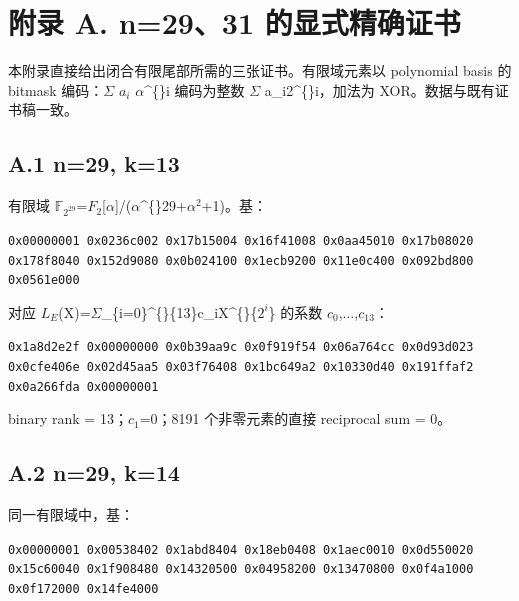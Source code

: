 \documentclass[11pt]{ctexart}
\begin{document}
\section{附录 A. n=29、31 的显式精确证书}

本附录直接给出闭合有限尾部所需的三张证书。有限域元素以 polynomial basis 的 bitmask 编码：\ensuremath{\Sigma} \ensuremath{a_{i}} \ensuremath{\alpha}\textasciicircum\{\}i 编码为整数 \ensuremath{\Sigma} a\_i2\textasciicircum\{\}i，加法为 XOR。数据与既有证书稿一致。

\subsection{A.1 n=29, k=13}

有限域 \ensuremath{\mathbb F_{2^29}}=\ensuremath{F_2}[\ensuremath{\alpha}]/(\ensuremath{\alpha}\textasciicircum\{\}29+\ensuremath{\ensuremath{\alpha}^2}+1)。基：

\begin{center}\begin{minipage}{0.95\linewidth}\small \texttt{0x00000001 0x0236c002 0x17b15004 0x16f41008 0x0aa45010 0x17b08020 0x178f8040 0x152d9080 0x0b024100 0x1ecb9200 0x11e0c400 0x092bd800 0x0561e000}\end{minipage}\end{center}

对应 \ensuremath{L_{E}}(X)=\ensuremath{\Sigma}\_\{i=0\}\textasciicircum\{\}\{13\}c\_iX\textasciicircum\{\}\{\ensuremath{2^{i}}\} 的系数 \ensuremath{c_0},\ensuremath{\ldots},\ensuremath{c_{13}}：

\begin{center}\begin{minipage}{0.95\linewidth}\small \texttt{0x1a8d2e2f 0x00000000 0x0b39aa9c 0x0f919f54 0x06a764cc 0x0d93d023 0x0cfe406e 0x02d45aa5 0x03f76408 0x1bc649a2 0x10330d40 0x191ffaf2 0x0a266fda 0x00000001}\end{minipage}\end{center}

binary rank = 13；\ensuremath{c_1}=0；8191 个非零元素的直接 reciprocal sum = 0。

\subsection{A.2 n=29, k=14}

同一有限域中，基：

\begin{center}\begin{minipage}{0.95\linewidth}\small \texttt{0x00000001 0x00538402 0x1abd8404 0x18eb0408 0x1aec0010 0x0d550020 0x15c60040 0x1f908480 0x14320500 0x04958200 0x13470800 0x0f4a1000 0x0f172000 0x14fe4000}\end{minipage}\end{center}
\end{document}
